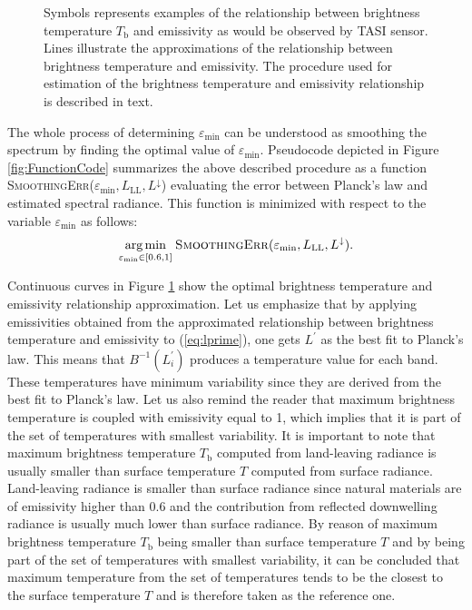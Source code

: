 \begin{figure}[!t]
\begin{subfigure}[t]{.3\linewidth}
		\caption{}
	\end{subfigure}
	\vspace{1.5 em}
	\caption{Symbols represents examples of the relationship between brightness temperature $T_\mathrm{b}$ and emissivity as would be observed by TASI sensor. Lines illustrate the approximations of the relationship between brightness temperature and emissivity. The procedure used for estimation of the brightness temperature and emissivity relationship is described in text.}
\label{fig:relationship}
\end{figure}

The whole process of determining $\varepsilon_\mathrm{min}$ can be understood as smoothing the spectrum by finding the optimal value of $\varepsilon_\mathrm{min}$. Pseudocode depicted in Figure \ref{fig:FunctionCode} summarizes the above described procedure as a function \textsc{SmoothingErr}($\varepsilon_\mathrm{min},L_\mathrm{LL},L^\downarrow$) evaluating the error between Planck's law and estimated spectral radiance. This function is minimized with respect to the variable $\varepsilon_\mathrm{min}$ as follows:
\begin{equation*}
\underset{\varepsilon_\mathrm{min} \in  {[0.6,1]}}{\text{arg\,min}}\:\text{\textsc{SmoothingErr}}(\varepsilon_\mathrm{min},L_\mathrm{LL},L^\downarrow).
\label{eq:costFunction}
\end{equation*}

Continuous curves in Figure \ref{fig:relationship} show the optimal brightness temperature and emissivity relationship approximation. Let us emphasize that by applying emissivities obtained from the approximated relationship between brightness temperature and emissivity to (\ref{eq:lprime}), one gets $L^\prime$ as the best fit to Planck's law. This means that $B^{-1}(L^\prime_i)$ produces a temperature value for each band. These temperatures have minimum variability since they are derived from the best fit to Planck's law. Let us also remind the reader that maximum brightness temperature is coupled with emissivity equal to 1, which implies that it is part of the set of temperatures with smallest variability. It is important to note that maximum brightness temperature $T_\mathrm{b}$ computed from land-leaving radiance is usually smaller than surface temperature $T$ computed from surface radiance. Land-leaving radiance is smaller than surface radiance since natural materials are of emissivity higher than $0.6$ and the contribution from reflected downwelling radiance is usually much lower than surface radiance. By reason of maximum brightness temperature $T_\mathrm{b}$ being smaller than surface temperature $T$ and by being part of the set of temperatures with smallest variability, it can be concluded that maximum temperature from the set of temperatures tends to be the closest to the surface temperature $T$ and is therefore taken as the reference one.


